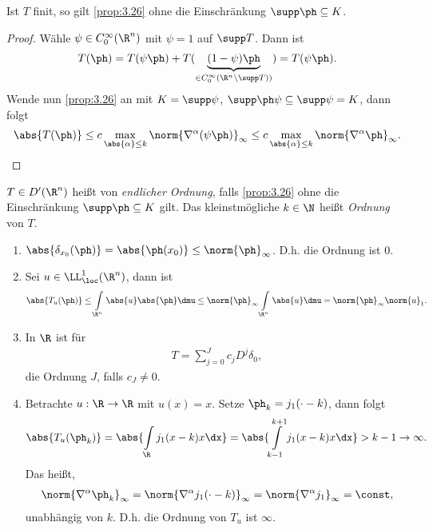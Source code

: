 \begin{cor}
\label{prop:3.27}
Ist $T$ finit, so gilt \ref{prop:3.26} ohne die Einschränkung $\supp
\ph\subseteq K$.\fishhere
\end{cor}
\begin{proof}
Wähle $\psi\in C_0^\infty(\R^n)$ mit $\psi = 1$ auf $\supp T$. Dann ist
\begin{align*}
T(\ph) = T(\psi\ph) + T(\underbrace{(1-\psi)\ph}_{\in
C_0^\infty(\R^n\setminus\supp T))}) = T(\psi\ph).
\end{align*}
Wende nun \ref{prop:3.26} an mit $K=\supp\psi$, $\supp\ph\psi\subseteq
\supp\psi = K$, dann folgt
\begin{align*}
\abs{T(\ph)} \le c\max\limits_{\abs{\alpha}\le k} \norm{\nabla^\alpha
(\psi\ph)}_\infty \le c \max\limits_{\abs{\alpha}\le k} \norm{\nabla^\alpha
\ph}_\infty.\qedhere
\end{align*}
\end{proof}

\begin{defn}
\label{defn:3.28}
$T\in D'(\R^n)$ heißt von \emph{endlicher Ordnung}, falls \ref{prop:3.26} ohne
die Einschränkung $\supp\ph\subseteq K$ gilt.
Das kleinstmögliche $k\in\N$ heißt \emph{Ordnung} von $T$.\fishhere
\end{defn}

\begin{bsp}
\label{bsp:3.29}
\begin{enumerate}[label=\arabic{*}.)]
  \item $\abs{\delta_{x_0}(\ph)} = \abs{\ph(x_0)} \le \norm{\ph}_\infty$. D.h.
  die Ordnung ist $0$.
  \item Sei $u\in\LL_\loc^1(\R^n)$, dann ist
\begin{align*}
\abs{T_u(\ph)} \le \int\limits_{\R^n} \abs{u}\abs{\ph}\dmu \le
\norm{\ph}_\infty \int\limits_{\R^n} \abs{u}\dmu = \norm{\ph}_\infty\norm{u}_1.
\end{align*}
\item In $\R$ ist für
\begin{align*}
T = \sum\limits_{j=0}^J c_j D^j\delta_0,
\end{align*}
die Ordnung $J$, falls $c_J\neq 0$.
\item Betrachte $u: \R\to\R$ mit $u(x) = x$. Setze $\ph_k = j_1(\cdot-k)$, dann
folgt
\begin{align*}
\abs{T_u(\ph_k)} = \abs{\int\limits_\R j_1(x-k)x\dx} =
\abs{\int\limits_{k-1}^{k+1} j_1(x-k)x\dx } > k-1 \to \infty.
\end{align*}
Das heißt,
\begin{align*}
\norm{\nabla^\alpha \ph_k}_\infty = \norm{\nabla^\alpha j_1(\cdot-k)}_\infty =
\norm{\nabla^\alpha j_1}_\infty = \const,
\end{align*}
unabhängig von $k$. D.h. die Ordnung von $T_u$ ist $\infty$.\bsphere
\end{enumerate}
\end{bsp}

